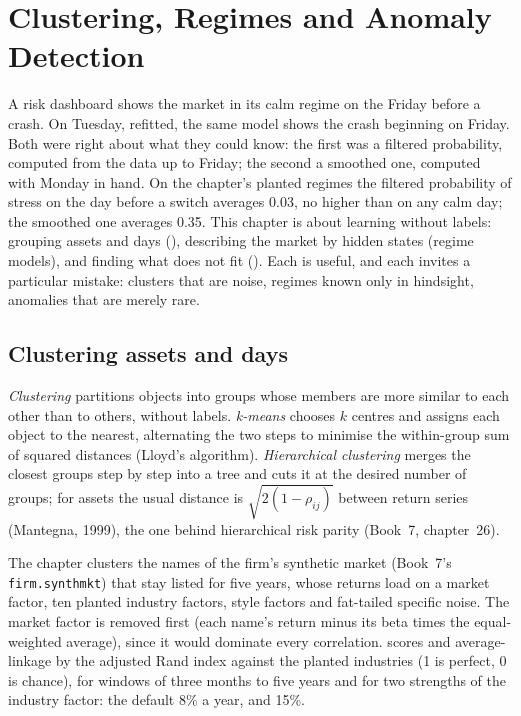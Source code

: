 \chapter{Clustering, Regimes and Anomaly Detection}\label{ch:ml:clustering-regimes-and-anomaly-detection}

A risk dashboard shows the market in its calm regime on the Friday before a crash. On Tuesday, refitted, the same model shows
the crash beginning on Friday. Both were right about what they could know: the first was a filtered probability, computed
from the data up to Friday; the second a smoothed one, computed with Monday in hand. On the chapter's planted regimes the
filtered probability of stress on the day before a switch averages 0.03, no higher than on any calm day; the smoothed one
averages 0.35. This chapter is about learning without labels: grouping assets and days (), describing the market
by hidden states (regime models), and finding what does not fit (). Each is useful, and each invites a
particular mistake: clusters that are noise, regimes known only in hindsight, anomalies that are merely rare.

\section{Clustering assets and days}

\begin{definition}\label{def:ml:clustering-regimes-and-anomaly-detection:cluster}
\emph{Clustering} partitions objects into groups whose members are more similar to each other than to
others, without labels. \emph{k-means} chooses $k$ centres and assigns each object to the nearest, alternating
the two steps to minimise the within-group sum of squared distances (Lloyd's algorithm). \emph{Hierarchical
clustering} merges the closest groups step by step into a tree and cuts it at the desired number
of groups; for assets the usual distance is $\sqrt{2(1-\rho_{ij})}$ between return series (Mantegna, 1999), the one behind
hierarchical risk parity (Book~7, chapter~26).
\end{definition}

The chapter clusters the names of the firm's synthetic market (Book~7's \texttt{firm.synthmkt}) that stay listed for five
years, whose returns load on a market factor, ten planted industry factors, style factors and fat-tailed specific noise. The
market factor is removed first (each name's return minus its beta times the equal-weighted average), since it would dominate
every correlation.  scores  and average-linkage  by the adjusted Rand
index against the planted industries (1 is perfect, 0 is chance), for windows of three months to five years and for two
strengths of the industry factor: the default 8\% a year, and 15\%.


